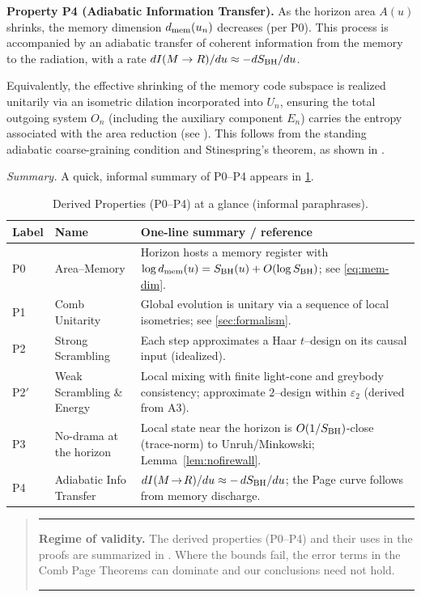\documentclass[a4paper,11pt]{article}
\newenvironment{infobox}{%
  \par\smallskip\begin{quote}\noindent\hrule\smallskip
}{%
  \smallskip\hrule\end{quote}\smallskip
}
\newenvironment{boxedresult}[1]{\begin{infobox}\noindent\textbf{#1.}}{\end{infobox}}
\theoremstyle{plain}
\theoremstyle{definition}
\theoremstyle{remark}
\begin{document}
\textbf{Property P4 (Adiabatic Information Transfer).}
As the horizon area $A(u)$ shrinks, the memory dimension $d_{\rm mem}(u_n)$ decreases (per P0). This process is accompanied by an adiabatic transfer of coherent information from the memory to the radiation, with a rate $dI(M\to R)/du \approx -dS_{\rm BH}/du$.

Equivalently, the effective shrinking of the memory code subspace is realized unitarily via an isometric dilation incorporated into $U_n$, ensuring the total outgoing system $O_n$ (including the auxiliary component $E_n$) carries the entropy associated with the area reduction (see ).
This follows from the standing adiabatic coarse-graining condition and Stinespring's theorem, as shown in .

\noindent\emph{Summary.} A quick, informal summary of P0--P4 appears in \cref{tab:postulates_glance}.

\begin{table}[htbp]
\centering
\caption{Derived Properties (P0--P4) at a glance (informal paraphrases).}
\label{tab:postulates_glance}
\footnotesize
\setlength{\tabcolsep}{4pt}
\begin{tabularx}{\textwidth}{@{}l l X@{}}
\toprule
\textbf{Label} & \textbf{Name} & \textbf{One-line summary / reference}\\
\midrule
P0 & Area--Memory & Horizon hosts a memory register with $\log d_{\rm mem}(u)=S_{\rm BH}(u)+O(\log S_{\rm BH})$; see \eqref{eq:mem-dim}.\\
P1 & Comb Unitarity & Global evolution is unitary via a sequence of local isometries; see \cref{sec:formalism}.\\
P2 & Strong Scrambling & Each step approximates a Haar $t$--design on its causal input (idealized).\\
P2$'$ & Weak Scrambling \& Energy & Local mixing with finite light-cone and greybody consistency; approximate $2$--design within $\varepsilon_2$ (derived from A3).\\
P3 & No-drama at the horizon & Local state near the horizon is $O(1/S_{\rm BH})$-close (trace-norm) to Unruh/Minkowski; Lemma~\ref{lem:nofirewall}.\\
P4 & Adiabatic Info Transfer & $dI(M\!\to\!R)/du \approx -\,dS_{\rm BH}/du$; the Page curve follows from memory discharge.\\
\bottomrule
\end{tabularx}
\end{table}
\begin{boxedresult}{Regime of validity}
The derived properties (P0--P4) and their uses in the proofs are summarized in . Where the bounds fail, the error terms in the Comb Page Theorems can dominate and our conclusions need not hold.
\end{boxedresult}
\end{document}
